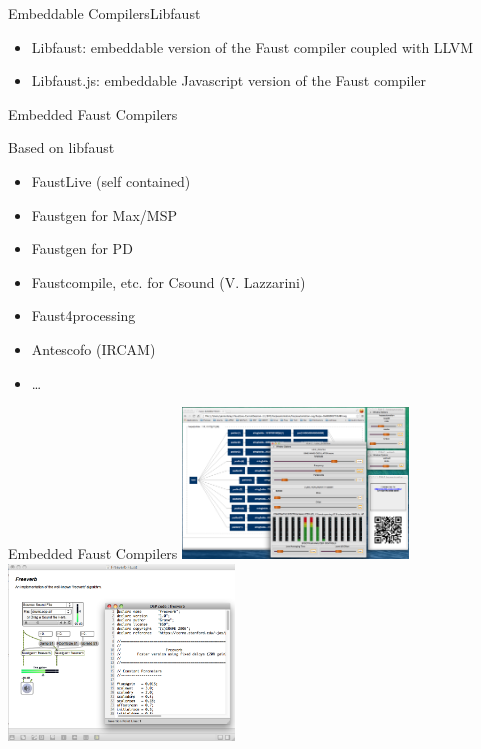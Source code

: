 
\begin{frame}[fragile]{Embeddable Compilers}{Libfaust}
    \begin{itemize}
        \item Libfaust: embeddable version of the Faust compiler coupled with LLVM
        \item Libfaust.js: embeddable Javascript version of the Faust compiler
    \end{itemize}
\end{frame}


\begin{frame}{Embedded Faust Compilers}
    \begin{block}{Based on libfaust}
        \begin{itemize}
            \item FaustLive (self contained)
            \item Faustgen for Max/MSP
            \item Faustgen for PD
            \item Faustcompile, etc. for Csound (V. Lazzarini)
            \item Faust4processing
            \item Antescofo (IRCAM)
            \item \ldots
        \end{itemize}    
    \end{block} 
\end{frame}


\begin{frame}{Embedded Faust Compilers}
    \includegraphics[width=0.45\textwidth]{images/FaustLiveSession}
    \hspace{0.2cm}
    \includegraphics[width=0.45\textwidth]{images/faustgen1.png}
\end{frame}
